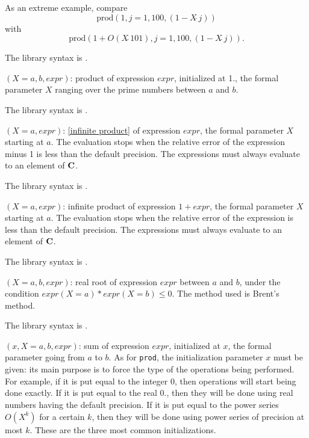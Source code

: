 As an extreme example, compare $$\text{prod}(1,j=1,100,(1-X\hat{\ }j))$$
with  $$\text{prod}(1+O(X\hat{\ }101),j=1, 100, (1-X\hat{\ }j) ).$$

The library syntax is .

$(X=a,b,expr)$: product of expression $expr$,
initialized at 1., the formal parameter $X$ ranging over the prime numbers
between $a$ and $b$.

The library syntax is .

$(X=a,expr)$: \ref{infinite product} of expression $expr$, 
the formal parameter $X$ starting at $a$. The evaluation stops when the 
relative error of the expression minus 1 is less than the default precision. 
The expressions must always evaluate to an element of $\Bbb C$.

The library syntax is .

$(X=a,expr)$: infinite product of expression $1+expr$, the
formal parameter $X$ starting at $a$. The evaluation stops when the relative 
error of the expression is less than the default precision. The expressions
must always evaluate to an element of $\Bbb C$.

The library syntax is .

$(X=a,b,expr)$: real root of expression $expr$ between $a$ and
$b$, under the condition $expr(X=a)*expr(X=b)\le0$. The method used is 
Brent's method.

The library syntax is .

$(x,X=a,b,expr)$: sum of expression $expr$, initialized at
$x$, the formal parameter going from $a$ to $b$. As for {\tt prod}, the
initialization parameter $x$ must be given: its main purpose is to force
the type of the operations being performed. For example, if it is put
equal to the integer 0, then operations will start being done exactly. 
If it is put equal to the real $0.$, then they will be done using real
numbers having the default precision. If it is put equal to the power
series $O(X^k)$ for a certain $k$, then they will be done using power
series of precision at most $k$. These are the three most common
initializations.

